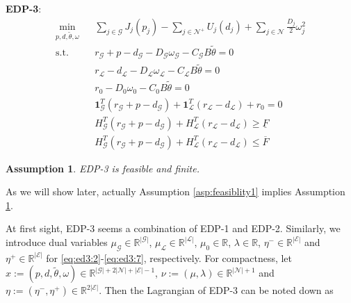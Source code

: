 \documentclass[journal,12pt,onecolumn,draftclsnofoot]{IEEEtran}
\newtheorem{assumption}{\textbf{Assumption}}
\begin{document}
\noindent
\textbf{EDP-3}:
\begin{subequations}
	\begin{eqnarray}
	\label{eq:ed3:1}
	\min_{p,d, \tilde \theta,\omega} &&   \sum_{j\in\mathcal{G}} {J_j}(p_j) - \sum_{j\in\mathcal{N}^+} {U_j}(d_j) + \sum_{j\in\mathcal{N}}\frac{D_j}{2} \omega_j^2  \\
	\label{eq:ed3:2}
	\mathrm{s.t.} &&   r_\mathcal{G} +p  - d_\mathcal{G}  - D_\mathcal{G}  \omega_{\mathcal{G}}   - C_{\mathcal{G}}  B  \tilde \theta =0\\
	\label{eq:ed3:3}
	&&  r_{\mathcal{L}} - d_{\mathcal{L}} - D_\mathcal{L} \omega_{\mathcal{L}} - C_{\mathcal{L}}  B   \tilde \theta = 0  \\
	 \label{eq:ed3:4}	 
     && r_0  - D_0 \omega_0 - C_0 B   \tilde \theta  =0 \\
	\label{eq:ed3:5}	
	 &&   \mathbf 1^T_\mathcal{G} (r_\mathcal{G}+p-d_\mathcal{G})  + \mathbf 1^T_\mathcal{L} (r_\mathcal{L}-d_\mathcal{L}) +r_0 = 0 \\
	\label{eq:ed3:6}
	&&    H^T_{\mathcal{G}}(r_\mathcal{G}+p-d_\mathcal{G}) + H^T_\mathcal{L}(r_\mathcal{L}-d_\mathcal{L}) \ge \underline{F}  \\
	\label{eq:ed3:7}
	&&  H^T_{\mathcal{G}}(r_\mathcal{G}+p-d_\mathcal{G}) + H^T_\mathcal{L}(r_\mathcal{L}-d_\mathcal{L})  \le  \overline{F}
	\end{eqnarray}	\label{eq3:ed}%
\end{subequations}
\begin{assumption}\label{asp:feasiblity2}
	EDP-3 is feasible and finite.	
\end{assumption}
\noindent
As we will show later, actually Assumption \ref{asp:feasiblity1} implies Assumption \ref{asp:feasiblity2}.

At first sight, EDP-3 seems a combination of EDP-1 and EDP-2. 
Similarly, we introduce dual variables $\mu_{\mathcal{G}}\in\mathbb{R}^{|\mathcal{G}|}$, $\mu_{\mathcal{L}}\in\mathbb{R}^{|\mathcal{L}|}$, $\mu_0\in\mathbb{R}$, $\lambda\in\mathbb{R}$, $\eta^- \in\mathbb{R}^{|\mathcal{E}|}$ and $\eta^+ \in\mathbb{R}^{|\mathcal{E}|}$ for \eqref{eq:ed3:2}-\eqref{eq:ed3:7}, respectively. For compactness, let $x:=(p,d,\tilde \theta,\omega)\in\mathbb{R}^{|\mathcal{G}|+2|\mathcal{N}|+|\mathcal{E}|-1}$, $\nu:=(\mu,\lambda)\in\mathbb{R}^{|\mathcal{N}|+1}$ and $\eta:=(\eta^-,\eta^+)\in\mathbb{R}^{2|\mathcal{E}|}$. Then the Lagrangian of EDP-3 can be noted down as
\end{document}
